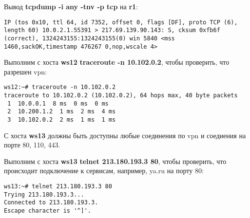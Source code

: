 \documentclass[a4paper,12pt]{article}
\begin{document}
Вывод \textbf{tcpdump -i any -tnv -p tcp} на \textbf{r1}:
\begin{Verbatim}
IP (tos 0x10, ttl 64, id 7352, offset 0, flags [DF], proto TCP (6), length 60) 10.0.2.1.55391 > 217.69.139.90.143: S, cksum 0xfb6f (correct), 1324243155:1324243155(0) win 5840 <mss 1460,sackOK,timestamp 476267 0,nop,wscale 4>
\end{Verbatim}

Выполним с хоста \textbf{ws12} \textbf{traceroute -n 10.102.0.2},  чтобы проверить,
что разрешен vpn:
\begin{Verbatim}
ws12:~# traceroute -n 10.102.0.2
traceroute to 10.102.0.2 (10.102.0.2), 64 hops max, 40 byte packets
 1  10.0.0.1  8 ms  0 ms  0 ms
 2  10.200.1.2  1 ms  2 ms  4 ms
 3  10.102.0.2  2 ms  1 ms  1 ms
\end{Verbatim}


С хоста \textbf{ws13} должны быть доступны любые соединения по vpn и соедиения
на порте 80, 110, 443.

Выполним с хоста \textbf{ws13} \textbf{telnet 213.180.193.3 80},  чтобы проверить, что
происходит подключение к сервисам, например, ya.ru на порту 80:
\begin{Verbatim}
ws13:~# telnet 213.180.193.3 80
Trying 213.180.193.3...
Connected to 213.180.193.3.
Escape character is '^]'.
\end{Verbatim}
\end{document}
